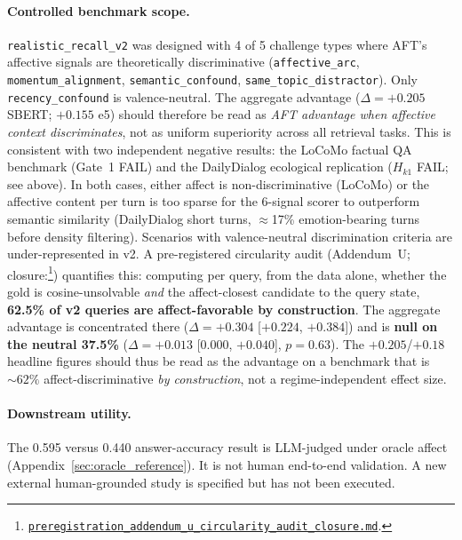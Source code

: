 \documentclass[11pt]{article}
\newcommand{\repourl}{https://github.com/gianlucamazza/emotional-memory}%
\begin{document}
\paragraph{Controlled benchmark scope.}
\texttt{realistic\_recall\_v2} was designed with 4 of 5 challenge types where
AFT's affective signals are theoretically discriminative
(\texttt{affective\_arc}, \texttt{momentum\_alignment},
\texttt{semantic\_confound}, \texttt{same\_topic\_distractor}).
Only \texttt{recency\_confound} is valence-neutral.
The aggregate advantage ($\Delta=+0.205$ SBERT; $+0.155$ e5) should therefore
be read as \emph{AFT advantage when affective context discriminates}, not as
uniform superiority across all retrieval tasks. This is consistent with two
independent negative results: the LoCoMo factual QA benchmark (Gate~1 FAIL)
and the DailyDialog ecological replication ($H_{k1}$ FAIL; see above).
In both cases, either affect is non-discriminative (LoCoMo) or the affective
content per turn is too sparse for the 6-signal scorer to outperform semantic
similarity (DailyDialog short turns, $\approx$17\% emotion-bearing turns before
density filtering). Scenarios with valence-neutral discrimination criteria are
under-represented in v2. A pre-registered circularity audit (Addendum~U; closure:\footnote{%
\href{\repourl/blob/main/benchmarks/preregistration\_addendum\_u\_circularity\_audit\_closure.md}%
{\texttt{preregistration\_addendum\_u\_circularity\_audit\_closure.md}}.}) quantifies this:
computing per query, from the data alone, whether the gold is cosine-unsolvable \emph{and}
the affect-closest candidate to the query state, \textbf{62.5\% of v2 queries are
affect-favorable by construction}. The aggregate advantage is concentrated there
($\Delta=+0.304$ [$+0.224$, $+0.384$]) and is \textbf{null on the neutral 37.5\%}
($\Delta=+0.013$ [$0.000$, $+0.040$], $p=0.63$). The $+0.205$/$+0.18$ headline figures
should thus be read as the advantage on a benchmark that is ${\sim}62\%$
affect-discriminative \emph{by construction}, not a regime-independent effect size.

\paragraph{Downstream utility.}
The 0.595 versus 0.440 answer-accuracy result is LLM-judged under oracle affect
(Appendix~\ref{sec:oracle_reference}). It is not human end-to-end validation.
A new external human-grounded study is specified but has not been executed.

\end{document}
